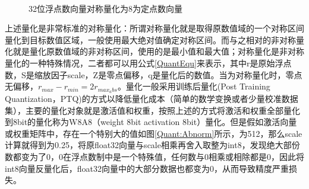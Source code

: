 \begin{figure}[htbp!]
	\centering
    
	\\
	\label{Quant}
	\caption{32位浮点数向量对称量化为8为定点数向量}
\end{figure}

上述量化是非常标准的对称量化：所谓对称量化就是取得原数值域的一个对称区间量化到目标数值区域，一般使用最大绝对值确定对称区间。而与之相对的非对称量化就是量化原数值域的非对称区间，使用的是最小值和最大值；对称量化是非对称量化的一种特殊情况，二者都可以用公式\ref{QuantEqu}来表示，其中r是原始浮点数，S是缩放因子scale，Z是零点偏移，q是量化后的数值。当为对称量化时，零点无偏移，$r_{max}-r_{min}=2r_{max_abs}$。量化一般采用训练后量化(Post Training Quantization，PTQ)的方式以降低量化成本（简单的数学变换或者少量校准数据集），主要的量化对象就是激活值和权重，按照上述的方式将激活和权重全部量化到8bit的量化称为W8A8（weight 8bit activation 8bit）量化。但是假如激活向量或权重矩阵中，存在一个特别大的值如图\ref{Quant:Abnorm}所示，为512，那么scale计算就得到为0.25，将原float32向量与scale相乘再舍入取整为int8，发现绝大部份数都变为了0，0在浮点数制中是一个特殊值，任何数与0相乘或相除都是0，因此将int8向量反量化后，float32向量中的大部分数据也都变为0，从而导致精度严重损失。


